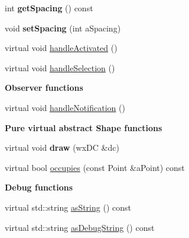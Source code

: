 \begin{DoxyCompactItemize}
\item 
int {\bfseries get\+Spacing} () const \hypertarget{class_view_1_1_rectangle_shape_a892ec0b500eaa885ee4514d1775a37e9}{}\label{class_view_1_1_rectangle_shape_a892ec0b500eaa885ee4514d1775a37e9}

\item 
void {\bfseries set\+Spacing} (int a\+Spacing)\hypertarget{class_view_1_1_rectangle_shape_aa1d0774ba0de3aeb2acdc6b4af528fd5}{}\label{class_view_1_1_rectangle_shape_aa1d0774ba0de3aeb2acdc6b4af528fd5}

\item 
virtual void \hyperlink{class_view_1_1_rectangle_shape_a6e075b3fda71d5dd4fbd3f3f9ff42126}{handle\+Activated} ()
\item 
virtual void \hyperlink{class_view_1_1_rectangle_shape_a15a3cd81166a65e5734b79c87552db00}{handle\+Selection} ()
\end{DoxyCompactItemize}
\begin{Indent}{\bf Observer functions}\par
\begin{DoxyCompactItemize}
\item 
virtual void \hyperlink{class_view_1_1_rectangle_shape_acae95cb4b05d77196451520ee7d7ca9c}{handle\+Notification} ()
\end{DoxyCompactItemize}
\end{Indent}
\begin{Indent}{\bf Pure virtual abstract Shape functions}\par
\begin{DoxyCompactItemize}
\item 
virtual void {\bfseries draw} (wx\+DC \&dc)\hypertarget{class_view_1_1_rectangle_shape_a430ce6f93a932205861ec0327df3ca42}{}\label{class_view_1_1_rectangle_shape_a430ce6f93a932205861ec0327df3ca42}

\item 
virtual bool \hyperlink{class_view_1_1_rectangle_shape_ac736dfe69f1a3633696d8c663cd49b51}{occupies} (const Point \&a\+Point) const 
\end{DoxyCompactItemize}
\end{Indent}
\begin{Indent}{\bf Debug functions}\par
\begin{DoxyCompactItemize}
\item 
virtual std\+::string \hyperlink{class_view_1_1_rectangle_shape_a82517a7fb6b1b0331efaa79f306ecc38}{as\+String} () const 
\item 
virtual std\+::string \hyperlink{class_view_1_1_rectangle_shape_ae46b92ba72ec4a590afbd106ced79c98}{as\+Debug\+String} () const 
\end{DoxyCompactItemize}
\end{Indent}
